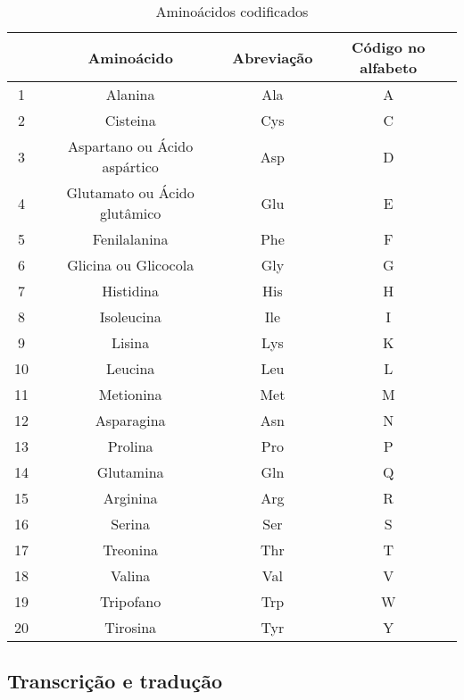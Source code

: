 \begin{table}[h!] 
\centering
\caption{Aminoácidos codificados} \label{tabelaAminoacidos}
\begin{tabular}{|c|c|c|c|} \hline
& Aminoácido & Abreviação & Código no alfabeto  \\  \hline
1 & Alanina & Ala & A \\ 
2 & Cisteina & Cys & C \\ 
3 & Aspartano ou Ácido aspártico & Asp & D \\ 
4 & Glutamato ou Ácido glutâmico & Glu & E \\ 
5 & Fenilalanina & Phe & F \\ 
6 & Glicina ou Glicocola & Gly & G \\ 
7 & Histidina & His & H \\ 
8 & Isoleucina & Ile & I \\ 
9 & Lisina & Lys & K \\ 
10 & Leucina & Leu & L \\ 
11 & Metionina & Met & M \\ 
12 & Asparagina & Asn & N \\ 
13 & Prolina & Pro & P \\ 
14 & Glutamina & Gln & Q \\ 
15 & Arginina & Arg & R \\ 
16 & Serina & Ser & S \\ 
17 & Treonina & Thr & T \\ 
18 & Valina & Val & V \\ 
19 & Tripofano & Trp & W \\ 
20 & Tirosina & Tyr & Y \\ \hline
 
\end{tabular}
\end{table}



\subsection{Transcrição e tradução} \label{sinteseDeProteina:transcricaoTraducaoSintese}




